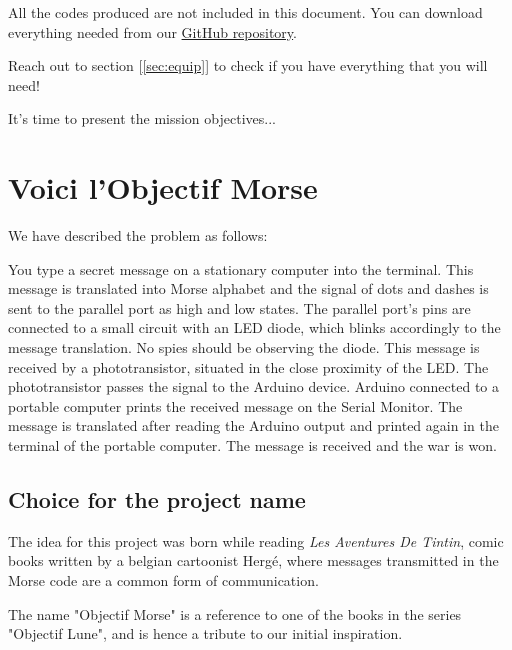 \documentclass[12pt]{report}
\begin{document}
All the codes produced are not included in this document. You can download everything needed from our \href{https://github.com/camillejr/objectif_morse}{GitHub repository}.

Reach out to section [\ref{sec:equip}] to check if you have everything that you will need!

It's time to present the mission objectives...

\section{Voici l'Objectif Morse}

We have described the problem as follows:

You type a secret message on a stationary computer into the terminal. This message is translated into Morse alphabet and the signal of dots and dashes is sent to the parallel port as high and low states. The parallel port's pins are connected to a small circuit with an LED diode, which blinks accordingly to the message translation. No spies should be observing the diode. This message is received by a phototransistor, situated in the close proximity of the LED. The phototransistor passes the signal to the Arduino device. Arduino connected to a portable computer prints the received message on the Serial Monitor. The message is translated after reading the Arduino output and printed again in the terminal of the portable computer. The message is received and the war is won.

\subsection{Choice for the project name}

The idea for this project was born while reading \textit{Les Aventures De Tintin}, comic books written by a belgian cartoonist Hergé, where messages transmitted in the Morse code are a common form of communication. 

The name "Objectif Morse" is a reference to one of the books in the series "Objectif Lune", and is hence a tribute to our initial inspiration.
\end{document}
